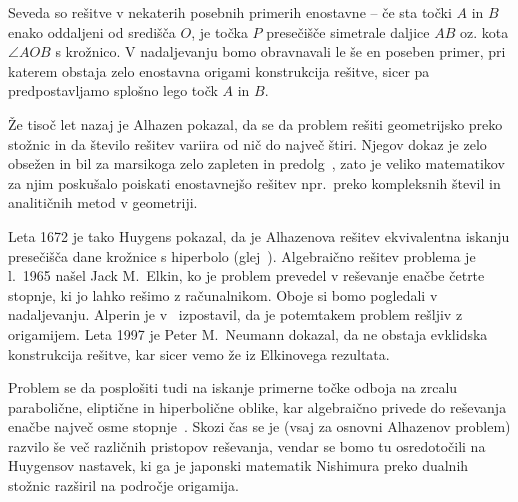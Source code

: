 Seveda so rešitve v nekaterih posebnih primerih enostavne -- če sta točki $A$ in $B$ enako oddaljeni od središča $O$, je točka $P$ presečišče simetrale daljice $AB$ oz. kota $\angle AOB$ s krožnico. V nadaljevanju bomo obravnavali le še en poseben primer, pri katerem obstaja zelo enostavna origami konstrukcija rešitve, sicer pa predpostavljamo splošno lego točk $A$ in $B$.


Že tisoč let nazaj je Alhazen pokazal, da se da problem rešiti geometrijsko preko stožnic in da število rešitev variira od nič do največ štiri. Njegov dokaz je zelo obsežen in bil za marsikoga zelo zapleten in predolg~\cite{wilk2015}, zato je veliko matematikov za njim poskušalo poiskati enostavnejšo rešitev npr.\ preko kompleksnih števil in analitičnih metod v geometriji.

Leta 1672 je tako Huygens pokazal, da je Alhazenova rešitev ekvivalentna iskanju presečišča dane krožnice s hiperbolo (glej~\cite{nishimura2018}). Algebraično rešitev problema je l.\ 1965 našel Jack M.\ Elkin, ko je problem prevedel v reševanje enačbe četrte stopnje, ki jo lahko rešimo z računalnikom. Oboje si bomo pogledali v nadaljevanju. Alperin je v~\cite{alperin2002} izpostavil, da je potemtakem problem rešljiv z origamijem. Leta 1997 je Peter M.\ Neumann dokazal, da ne obstaja evklidska konstrukcija rešitve, kar sicer vemo že iz Elkinovega rezultata.

Problem se da posplošiti tudi na iskanje primerne točke odboja na zrcalu parabolične, eliptične in hiperbolične oblike, kar algebraično privede do reševanja enačbe največ osme stopnje~\cite{alhproblemwiki}. Skozi čas se je (vsaj za osnovni Alhazenov problem) razvilo še več različnih pristopov reševanja, vendar se bomo tu osredotočili na Huygensov nastavek, ki ga je japonski matematik Nishimura preko dualnih stožnic razširil na področje origamija.

